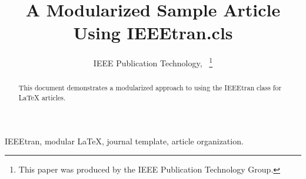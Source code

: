 \documentclass[lettersize,journal]{IEEEtran}
\begin{document}
\title{A Modularized Sample Article Using IEEEtran.cls}
\author{IEEE Publication Technology,~%
	\thanks{This paper was produced by the IEEE Publication Technology Group.}%
}

\maketitle

\begin{abstract}
	This document demonstrates a modularized approach to using the IEEEtran class
	for LaTeX articles.
\end{abstract}

\begin{IEEEkeywords}
	IEEEtran, modular LaTeX, journal template, article organization.
\end{IEEEkeywords}






\end{document}
